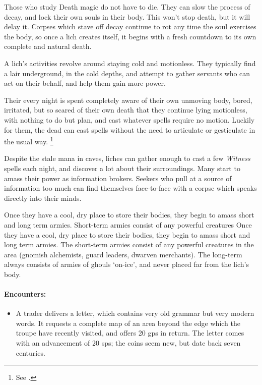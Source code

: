 \begin{multicols}{2}

\noindent
Those who study Death magic do not have to die.
They can slow the process of decay, and lock their own souls in their body.
This won't stop death, but it will delay it.
Corpses which stave off decay continue to rot any time the soul exercises the body, so once a lich creates itself, it begins with a fresh countdown to its own complete and natural death.

A lich's activities revolve around staying cold and motionless.
They typically find a lair underground, in the cold depths, and attempt to gather servants who can act on their behalf, and help them gain more power.

Their every night is spent completely aware of their own unmoving body, bored, irritated, but so scared of their own death that they continue lying motionless, with nothing to do but plan, and cast whatever spells require no motion.
Luckily for them, the dead can cast spells without the need to articulate or gesticulate in the usual way.%
\footnote{See .}

Despite the stale mana in caves, liches can gather enough to cast a few \textit{Witness} spells each night, and discover a lot about their surroundings.
Many start to amass their power as information brokers.
Seekers who pull at a source of information too much can find themselves face-to-face with a corpse which speaks directly into their minds.

Once they have a cool, dry place to store their bodies, they begin to amass short and long term armies.
Short-term armies consist of any powerful creatures
Once they have a cool, dry place to store their bodies, they begin to amass short and long term armies.
The short-term armies consist of any powerful creatures in the area (gnomish alchemists, \gls{guard} leaders, dwarven merchants).
The long-term always consists of armies of ghouls `on-ice', and never placed far from the lich's body.

\lich

\showStdSpells

\needspace{4em}
\paragraph{Encounters:}
\begin{itemize}
  \item
  A trader delivers a letter, which contains very old grammar but very modern words.
  It requests a complete map of an area beyond the \gls{edge} which the troupe have recently visited, and offers 20 \glspl{gp} in return.
  The letter comes with an advancement of 20 \glspl{sp}; the coins seem new, but date back seven centuries.


\end{itemize}
\end{multicols}

